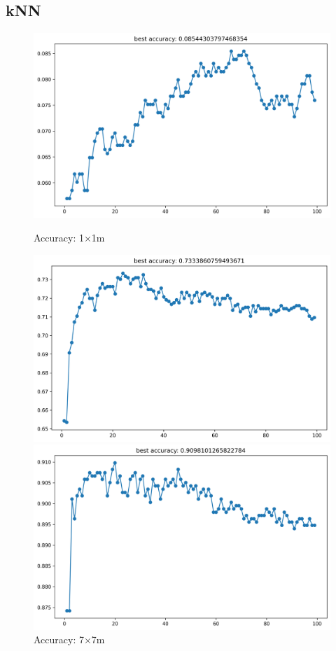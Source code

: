 \documentclass[runningheads]{llncs}
\begin{document}
\subsection*{kNN}

\begin{figure}[H]
	\centering
	\begin{minipage}{0.32\textwidth}
		\centering
		\includegraphics[width=\textwidth]{figures/knn_acc_1.png}
		\caption*{Accuracy: 1×1m}
	\end{minipage}
	\hfill
	\begin{minipage}{0.32\textwidth}
		\centering
		\includegraphics[width=\textwidth]{figures/knn_acc_7.png}
		\caption*{Accuracy: 7×7m}
	\end{minipage}
	\hfill
	\begin{minipage}{0.32\textwidth}
		\centering
		\includegraphics[width=\textwidth]{figures/knn_acc_15.png}

\end{minipage}
\end{figure}
\end{document}
